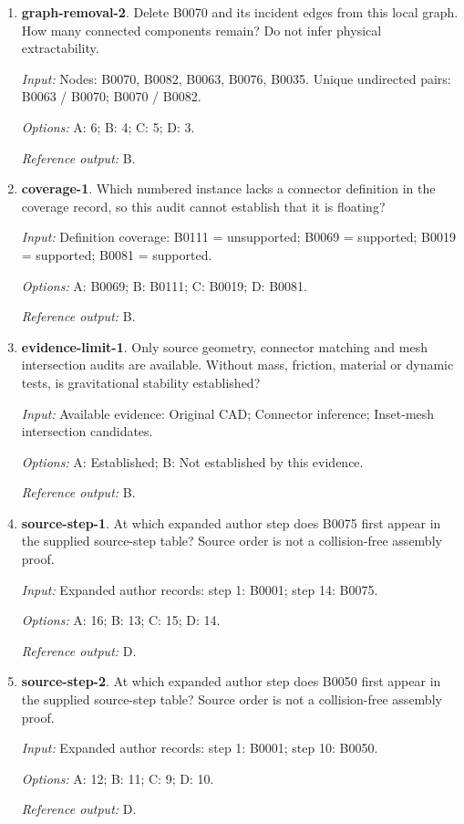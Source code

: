 \begin{enumerate}
\item \textbf{graph-removal-2}. Delete B0070 and its incident edges from this local graph. How many connected components remain? Do not infer physical extractability.\par {\small \textit{Input:} Nodes: B0070, B0082, B0063, B0076, B0035. Unique undirected pairs: B0063 / B0070; B0070 / B0082. \par\textit{Options:} A: 6; B: 4; C: 5; D: 3. \par\textit{Reference output:} B.}
\item \textbf{coverage-1}. Which numbered instance lacks a connector definition in the coverage record, so this audit cannot establish that it is floating?\par {\small \textit{Input:} Definition coverage: B0111 = unsupported; B0069 = supported; B0019 = supported; B0081 = supported. \par\textit{Options:} A: B0069; B: B0111; C: B0019; D: B0081. \par\textit{Reference output:} B.}
\item \textbf{evidence-limit-1}. Only source geometry, connector matching and mesh intersection audits are available. Without mass, friction, material or dynamic tests, is gravitational stability established?\par {\small \textit{Input:} Available evidence: Original CAD; Connector inference; Inset-mesh intersection candidates. \par\textit{Options:} A: Established; B: Not established by this evidence. \par\textit{Reference output:} B.}
\item \textbf{source-step-1}. At which expanded author step does B0075 first appear in the supplied source-step table? Source order is not a collision-free assembly proof.\par {\small \textit{Input:} Expanded author records: step 1: B0001; step 14: B0075. \par\textit{Options:} A: 16; B: 13; C: 15; D: 14. \par\textit{Reference output:} D.}
\item \textbf{source-step-2}. At which expanded author step does B0050 first appear in the supplied source-step table? Source order is not a collision-free assembly proof.\par {\small \textit{Input:} Expanded author records: step 1: B0001; step 10: B0050. \par\textit{Options:} A: 12; B: 11; C: 9; D: 10. \par\textit{Reference output:} D.}

\end{enumerate}
